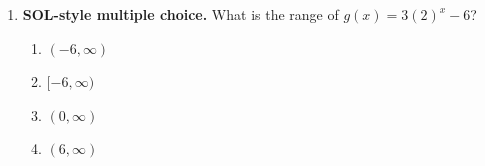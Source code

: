 \documentclass[10pt]{article}
\begin{document}
\begin{enumerate}[leftmargin=1.8em, itemsep=9pt]
  \item \textbf{SOL-style multiple choice.} What is the range of $g(x)=3(2)^{x}-6$?
        \begin{enumerate}[label=\Alph*., leftmargin=1.9em, itemsep=1pt]
          \item $(-6,\infty)$
          \item $[-6,\infty)$
          \item $(0,\infty)$
          \item $(6,\infty)$
        \end{enumerate}
\end{enumerate}
\end{document}
